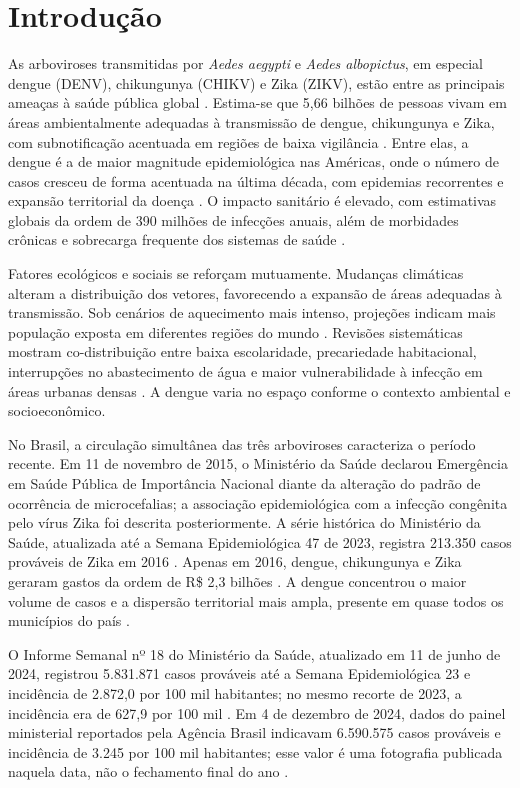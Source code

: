 \chapter{Introdução}
\label{cap:introducao}

As arboviroses transmitidas por \textit{Aedes aegypti} e \textit{Aedes albopictus}, em especial dengue (DENV), chikungunya (CHIKV) e Zika (ZIKV), estão entre as principais ameaças à saúde pública global \cite{gould2017}. Estima-se que 5,66 bilhões de pessoas vivam em áreas ambientalmente adequadas à transmissão de dengue, chikungunya e Zika, com subnotificação acentuada em regiões de baixa vigilância \cite{lim2025a}. Entre elas, a dengue é a de maior magnitude epidemiológica nas Américas, onde o número de casos cresceu de forma acentuada na última década, com epidemias recorrentes e expansão territorial da doença \cite{lim2025a,parums2025}. O impacto sanitário é elevado, com estimativas globais da ordem de 390 milhões de infecções anuais, além de morbidades crônicas e sobrecarga frequente dos sistemas de saúde \cite{parums2025}.

Fatores ecológicos e sociais se reforçam mutuamente. Mudanças climáticas alteram a distribuição dos vetores, favorecendo a expansão de áreas adequadas à transmissão. Sob cenários de aquecimento mais intenso, projeções indicam mais população exposta em diferentes regiões do mundo \cite{ryan2019}. Revisões sistemáticas mostram co-distribuição entre baixa escolaridade, precariedade habitacional, interrupções no abastecimento de água e maior vulnerabilidade à infecção em áreas urbanas densas \cite{power2022}. A dengue varia no espaço conforme o contexto ambiental e socioeconômico.

No Brasil, a circulação simultânea das três arboviroses caracteriza o período recente. Em 11 de novembro de 2015, o Ministério da Saúde declarou Emergência em Saúde Pública de Importância Nacional diante da alteração do padrão de ocorrência de microcefalias; a associação epidemiológica com a infecção congênita pelo vírus Zika foi descrita posteriormente. A série histórica do Ministério da Saúde, atualizada até a Semana Epidemiológica 47 de 2023, registra 213.350 casos prováveis de Zika em 2016 \cite{portaria1813,ms_zika}. Apenas em 2016, dengue, chikungunya e Zika geraram gastos da ordem de R\$ 2,3 bilhões \cite{2018-teich-arinelli-fahham}. A dengue concentrou o maior volume de casos e a dispersão territorial mais ampla, presente em quase todos os municípios do país \cite{pescarini2022}.

O Informe Semanal nº 18 do Ministério da Saúde, atualizado em 11 de junho de 2024, registrou 5.831.871 casos prováveis até a Semana Epidemiológica 23 e incidência de 2.872,0 por 100 mil habitantes; no mesmo recorte de 2023, a incidência era de 627,9 por 100 mil \cite{ms_informe2024}. Em 4 de dezembro de 2024, dados do painel ministerial reportados pela Agência Brasil indicavam 6.590.575 casos prováveis e incidência de 3.245 por 100 mil habitantes; esse valor é uma fotografia publicada naquela data, não o fechamento final do ano \cite{agenciabrasil_dengue2024}.

